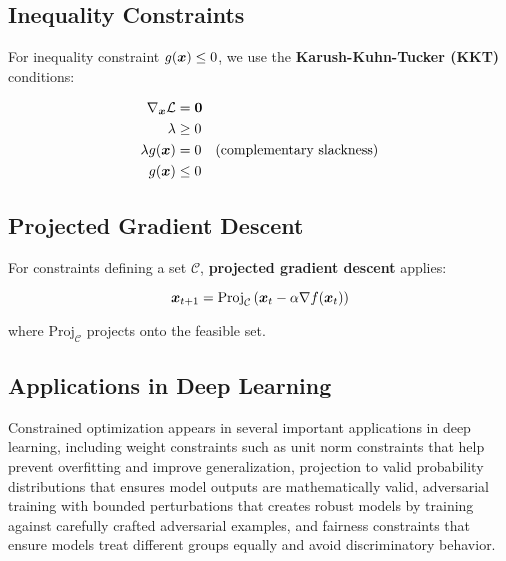 \subsection{Inequality Constraints}

For inequality constraint $g(\boldsymbol{x}) \leq 0$, we use the \textbf{Karush-Kuhn-Tucker (KKT)} conditions:

\begin{align}
\nabla_{\boldsymbol{x}} \mathcal{L} &= \boldsymbol{0} \\
\lambda &\geq 0 \\
\lambda g(\boldsymbol{x}) &= 0 \quad \text{(complementary slackness)} \\
g(\boldsymbol{x}) &\leq 0
\end{align}

\subsection{Projected Gradient Descent}

For constraints defining a set $\mathcal{C}$, \textbf{projected gradient descent} applies:

\begin{equation}
\boldsymbol{x}_{t+1} = \text{Proj}_{\mathcal{C}}\left(\boldsymbol{x}_t - \alpha \nabla f(\boldsymbol{x}_t)\right)
\end{equation}

where $\text{Proj}_{\mathcal{C}}$ projects onto the feasible set.

\subsection{Applications in Deep Learning}

Constrained optimization appears in several important applications in deep learning, including weight constraints such as unit norm constraints that help prevent overfitting and improve generalization, projection to valid probability distributions that ensures model outputs are mathematically valid, adversarial training with bounded perturbations that creates robust models by training against carefully crafted adversarial examples, and fairness constraints that ensure models treat different groups equally and avoid discriminatory behavior.
